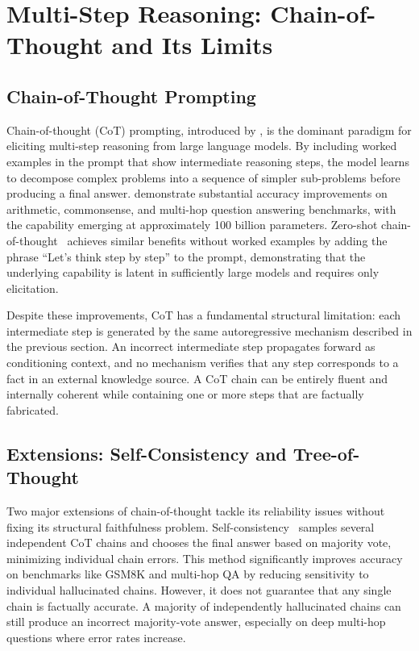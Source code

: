 \section{Multi-Step Reasoning: Chain-of-Thought and Its Limits}
\label{sec:cot}

\subsection{Chain-of-Thought Prompting}

Chain-of-thought (CoT) prompting, introduced by \citet{wei2022cot}, is the dominant paradigm for eliciting multi-step reasoning from large language models. By including worked examples in the prompt that show intermediate reasoning steps, the model learns to decompose complex problems into a sequence of simpler sub-problems before producing a final answer. \citet{wei2022cot} demonstrate substantial accuracy improvements on arithmetic, commonsense, and multi-hop question answering benchmarks, with the capability emerging at approximately 100 billion parameters. Zero-shot chain-of-thought~\citep{kojima2022zero} achieves similar benefits without worked examples by adding the phrase ``Let's think step by step'' to the prompt, demonstrating that the underlying capability is latent in sufficiently large models and requires only elicitation.

Despite these improvements, CoT has a fundamental structural limitation: each intermediate step is generated by the same autoregressive mechanism described in the previous section. An incorrect intermediate step propagates forward as conditioning context, and no mechanism verifies that any step corresponds to a fact in an external knowledge source. A CoT chain can be entirely fluent and internally coherent while containing one or more steps that are factually fabricated.

\subsection{Extensions: Self-Consistency and Tree-of-Thought}

Two major extensions of chain-of-thought tackle its reliability issues without fixing its structural faithfulness problem. Self-consistency~\citep{wang2023selfconsistency} samples several independent CoT chains and chooses the final answer based on majority vote, minimizing individual chain errors. This method significantly improves accuracy on benchmarks like GSM8K and multi-hop QA by reducing sensitivity to individual hallucinated chains. However, it does not guarantee that any single chain is factually accurate. A majority of independently hallucinated chains can still produce an incorrect majority-vote answer, especially on deep multi-hop questions where error rates increase.


